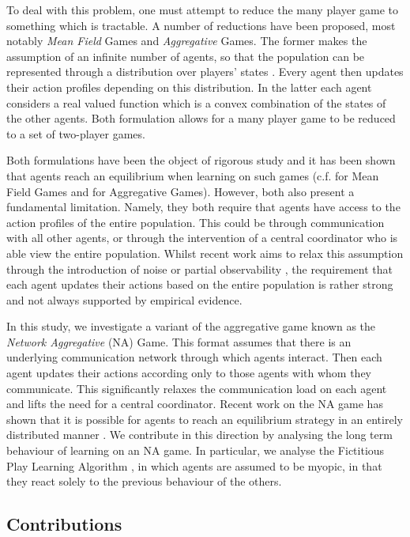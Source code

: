 \documentclass{article}
\theoremstyle{definition}
\begin{document}
To deal with this problem, one must attempt to reduce the many player game to something which is
tractable. A number of reductions have been proposed, most notably \emph{Mean Field} Games
and \emph{Aggregative} Games. The former makes the assumption of an infinite
number of agents, so that the population can be represented through a distribution over players'
states \cite{Huang2006} . Every agent then updates their action profiles depending on this
distribution. In the latter each agent considers a real valued function which is a convex
combination of the states of the other agents. Both formulation allows for a many player game to be reduced to a set of two-player games.

Both formulations have been the object of rigorous study and it has been shown that agents reach an equilibrium when learning on such games (c.f. \cite{Perrin2020} for Mean Field Games and
\cite{Jensen2010, DePersis2020, Parise2020} for Aggregative Games). However, both also present a fundamental limitation.
Namely, they both require that agents have access to the action profiles of the entire population.
This could be through communication with all other agents, or through the intervention of a central
coordinator who is able view the entire population. Whilst recent work aims to relax this assumption
through the introduction of noise \cite{Perrin2020} or partial observability \cite{Elie2020}, the
requirement that each agent updates their actions based on the entire population is rather strong and not always supported by empirical evidence.

In this study, we investigate a variant of the aggregative game known as the \emph{Network
Aggregative} (NA) Game. This format assumes that there is an underlying communication network
through which agents interact. Then each agent updates their actions according only to those agents
with whom they communicate. This significantly relaxes the communication load on each agent and
lifts the need for a central coordinator. Recent work on the NA game has shown that it is possible
for agents to reach an equilibrium strategy in an entirely distributed manner \cite{Koshal2016, Shokri2020, Shokri2021, Parise2015}. We contribute in this direction by analysing the long term behaviour of learning on an NA game. In particular, we analyse the Fictitious Play Learning
Algorithm \cite{Brown1949, Harris1998}, in which agents are assumed to be myopic, in that they react solely
to the previous behaviour of the others.


\subsection{Contributions}
\end{document}
